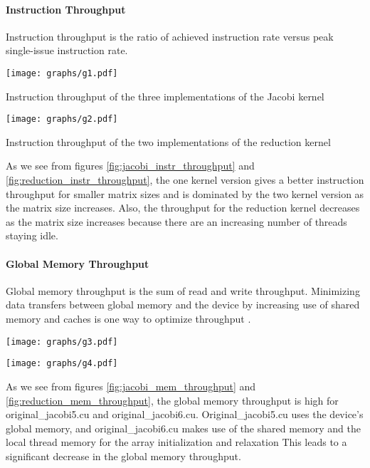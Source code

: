 \documentclass[10pt]{article}
\makeatletter
\newenvironment{figurehere}
{\def\@captype{figure}}
{}
\makeatother
\begin{document}
\begin{multicols}{2}
  \paragraph{Instruction Throughput}
  Instruction throughput is the ratio of achieved instruction rate versus peak single-issue instruction rate.

  \begin{figurehere}
    \centering
    \texttt{[image: graphs/g1.pdf]}
    \caption{Instruction throughput of the three implementations of the Jacobi kernel}
    \label{fig:jacobi_instr_throughput}
  \end{figurehere}

  \begin{figurehere}
    \centering
    \texttt{[image: graphs/g2.pdf]}
    \caption{Instruction throughput of the two implementations of the reduction kernel}
    \label{fig:reduction_instr_throughput}
  \end{figurehere}

  As we see from figures \ref{fig:jacobi_instr_throughput} and \ref{fig:reduction_instr_throughput}, the one kernel version gives a better instruction throughput for smaller matrix sizes and is dominated by the two kernel version as the matrix size increases.
  Also, the throughput for the reduction kernel decreases as the  matrix size increases because there are an increasing number of threads staying idle. 

  \paragraph{Global Memory Throughput}
  Global memory throughput is the sum of read and write throughput.
  Minimizing data transfers between global memory and the device by increasing use of shared memory and caches is one way to optimize throughput \cite{bib:nvidia}.

  \begin{figurehere}
    \centering
    \texttt{[image: graphs/g3.pdf]}
    \caption{}
    \label{fig:jacobi_mem_throughput}
  \end{figurehere}

  \begin{figurehere}
    \centering
    \texttt{[image: graphs/g4.pdf]}
    \caption{}
    \label{fig:reduction_mem_throughput}
  \end{figurehere}
  As we see from figures \ref{fig:jacobi_mem_throughput} and \ref{fig:reduction_mem_throughput}, the global memory throughput is high for original\_jacobi5.cu and original\_jacobi6.cu.
  Original\_jacobi5.cu uses the device's global memory, and original\_jacobi6.cu makes use of the shared memory and the local thread memory for the array initialization and relaxation 
  This leads to a significant decrease in the global memory throughput.


\end{multicols}
\end{document}
